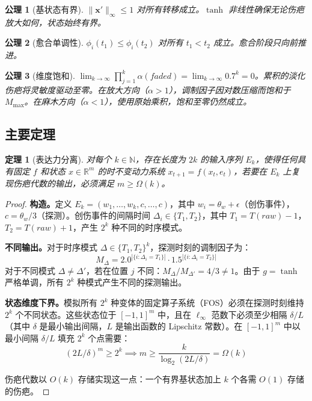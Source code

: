 \documentclass[11pt]{article}
\newtheorem{theorem}{定理}[section]
\newtheorem{axiom}{公理}[section]
\begin{document}
\begin{axiom}[基状态有界]
\label{ax:scar-bounded}
$\|\mathbf{x}'\|_\infty \leq 1$ 对所有转移成立。$\tanh$ 非线性确保无论伤疤放大如何，状态始终有界。
\end{axiom}

\begin{axiom}[愈合单调性]
\label{ax:scar-heal}
$\phi_i(t_1) \leq \phi_i(t_2)$ 对所有 $t_1 < t_2$ 成立。愈合阶段只向前推进。
\end{axiom}

\begin{axiom}[维度饱和]
\label{ax:scar-sat}
$\lim_{k \to \infty} \prod_{j=1}^k \alpha(faded) = \lim_{k \to \infty} 0.7^k = 0$。累积的淡化伤疤将灵敏度驱动至零。在放大方向（$\alpha > 1$），调制因子因对数压缩而饱和于 $M_{\max}$。在麻木方向（$\alpha < 1$），使用原始乘积，饱和至零仍然成立。
\end{axiom}

\subsection{主要定理}

\begin{theorem}[表达力分离]
\label{thm:scar-expressiveness}
对每个 $k \in \mathbb{N}$，存在长度为 $2k$ 的输入序列 $E_k$，使得任何具有固定 $f$ 和状态 $x \in \mathbb{R}^m$ 的时不变动力系统 $x_{t+1} = f(x_t, e_t)$，若要在 $E_k$ 上复现伤疤代数的输出，必须满足 $m \geq \Omega(k)$。
\end{theorem}

\begin{proof}
\textbf{构造。}定义 $E_k = (w_1, \ldots, w_k, c, \ldots, c)$，其中 $w_i = \theta_w + \epsilon$（创伤事件），$c = \theta_w/3$（探测）。创伤事件的间隔时间 $\Delta_i \in \{T_1, T_2\}$，其中 $T_1 = T(raw) - 1$，$T_2 = T(raw) + 1$，产生 $2^k$ 种不同的时序模式。

\textbf{不同输出。}对于时序模式 $\Delta \in \{T_1, T_2\}^k$，探测时刻的调制因子为：
\begin{equation}
M_\Delta = 2.0^{|\{i: \Delta_i = T_1\}|} \cdot 1.5^{|\{i: \Delta_i = T_2\}|}
\end{equation}
对于不同模式 $\Delta \neq \Delta'$，若在位置 $j$ 不同：$M_\Delta / M_{\Delta'} = 4/3 \neq 1$。由于 $g = \tanh$ 严格单调，所有 $2^k$ 种模式产生不同的探测输出。

\textbf{状态维度下界。}模拟所有 $2^k$ 种变体的固定算子系统（FOS）必须在探测时刻维持 $2^k$ 个不同状态。这些状态位于 $[-1,1]^m$ 中，且在 $\ell_\infty$ 范数下必须至少相隔 $\delta/L$（其中 $\delta$ 是最小输出间隔，$L$ 是输出函数的 Lipschitz 常数）。在 $[-1,1]^m$ 中以最小间隔 $\delta/L$ 填充 $2^k$ 个点需要：
\begin{equation}
(2L/\delta)^m \geq 2^k \implies m \geq \frac{k}{\log_2(2L/\delta)} = \Omega(k)
\end{equation}

伤疤代数以 $O(k)$ 存储实现这一点：一个有界基状态加上 $k$ 个各需 $O(1)$ 存储的伤疤。
\end{proof}
\end{document}
